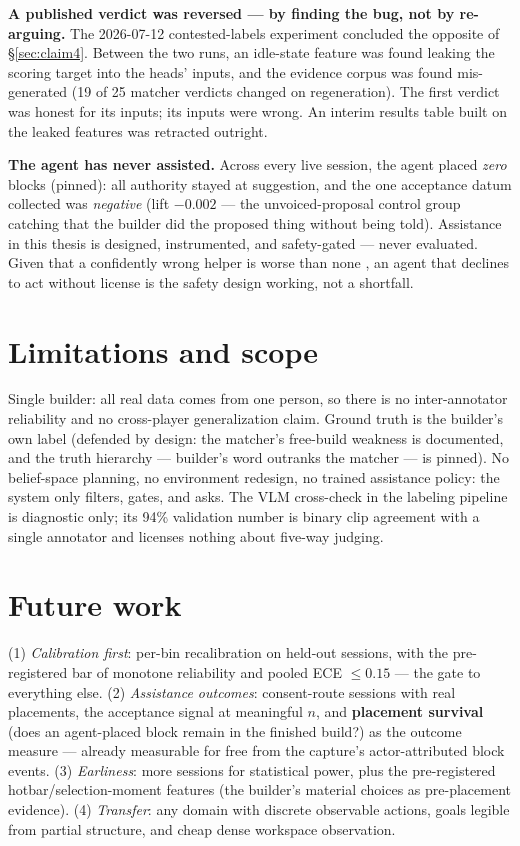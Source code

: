 \documentclass[11pt]{article}
\begin{document}
\textbf{A published verdict was reversed --- by finding the bug, not by
re-arguing.} The 2026-07-12 contested-labels experiment concluded the opposite
of \S\ref{sec:claim4}. Between the two runs, an idle-state feature was found
leaking the scoring target into the heads' inputs, and the evidence corpus was
found mis-generated (19 of 25 matcher verdicts changed on regeneration). The
first verdict was honest for its inputs; its inputs were wrong. An interim
results table built on the leaked features was retracted outright.

\textbf{The agent has never assisted.} Across every live session, the agent
placed \emph{zero} blocks (pinned): all authority stayed at suggestion, and
the one acceptance datum collected was \emph{negative} (lift $-0.002$ --- the
unvoiced-proposal control group catching that the builder did the proposed
thing without being told). Assistance in this thesis is designed,
instrumented, and safety-gated --- never evaluated. Given that a confidently
wrong helper is worse than none \cite{wah}, an agent that declines to act
without license is the safety design working, not a shortfall.

\section{Limitations and scope}

Single builder: all real data comes from one person, so there is no
inter-annotator reliability and no cross-player generalization claim. Ground
truth is the builder's own label (defended by design: the matcher's free-build
weakness is documented, and the truth hierarchy --- builder's word outranks
the matcher --- is pinned). No belief-space planning, no environment redesign,
no trained assistance policy: the system only filters, gates, and asks. The
VLM cross-check in the labeling pipeline is diagnostic only; its 94\%
validation number is binary clip agreement with a single annotator and
licenses nothing about five-way judging.

\section{Future work}

(1) \emph{Calibration first}: per-bin recalibration on held-out sessions, with
the pre-registered bar of monotone reliability and pooled ECE $\le 0.15$ ---
the gate to everything else. (2) \emph{Assistance outcomes}: consent-route
sessions with real placements, the acceptance signal at meaningful $n$, and
\textbf{placement survival} (does an agent-placed block remain in the finished
build?) as the outcome measure --- already measurable for free from the
capture's actor-attributed block events. (3) \emph{Earliness}: more sessions
for statistical power, plus the pre-registered hotbar/selection-moment
features (the builder's material choices as pre-placement evidence). (4)
\emph{Transfer}: any domain with discrete observable actions, goals legible
from partial structure, and cheap dense workspace observation.
\end{document}
